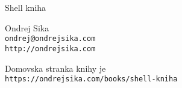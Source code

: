 \maketitle

\newpage

$$$$

\vfill

{\LARGE Shell kniha}
\vspace{0.3cm}

{\large Ondrej Sika}\\
\texttt{ondrej@ondrejsika.com}\\
\texttt{http://ondrejsika.com}
\vspace{0.8cm}

Domovska stranka knihy je\\
\texttt{https://ondrejsika.com/books/shell-kniha}

\newpage

$$$$

\tableofcontents

